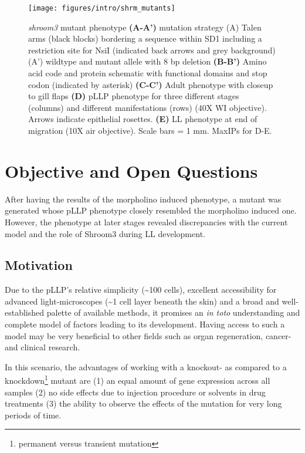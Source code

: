 \documentclass[11pt,singlespacinge,twoside]{reedthesis} %
\begin{document}
\begin{figure}

{\centering \texttt{[image: figures/intro/shrm\_mutants]} 

}

\caption[shroom3 mutant phenotype]{\emph{shroom3} mutant phenotype \textbf{(A-A')} mutation strategy (A) Talen arms (black blocks) bordering a sequence within SD1 including a restriction site for NsiI (indicated back arrows and grey background) (A') wildtype and mutant allele with 8 bp deletion \textbf{(B-B')} Amino acid code and protein schematic with functional domains and stop codon (indicated by asterisk) \textbf{(C-C')} Adult phenotype with closeup to gill flaps \textbf{(D)} pLLP phenotype for three different stages (columns) and different manifestations (rows) (40X WI objective). Arrows indicate epithelial rosettes. \textbf{(E)} LL phenotype at end of migration (10X air objective). Scale bars = 1 mm. MaxIPs for D-E.}\label{fig:shrmmut}
\end{figure}
\hypertarget{objective-and-open-questions}{%
\section{Objective and Open Questions}\label{objective-and-open-questions}}

After having the results of the morpholino induced phenotype, a mutant was generated whose pLLP phenotype closely resembled the morpholino induced one. However, the phenotype at later stages revealed discrepancies with the current model and the role of Shroom3 during LL development.

\hypertarget{motivation}{%
\subsection{Motivation}\label{motivation}}

Due to the pLLP's relative simplicity (\textasciitilde{}100 cells), excellent accessibility for advanced light-microscopes (\textasciitilde{}1 cell layer beneath the skin) and a broad and well-established palette of available methods, it promises an \emph{in toto} understanding and complete model of factors leading to its development. Having access to such a model may be very beneficial to other fields such as organ regeneration, cancer- and clinical research.

In this scenario, the advantages of working with a knockout- as compared to a knockdown\footnote{permanent versus transient mutation} mutant are (1) an equal amount of gene expression across all samples (2) no side effects due to injection procedure or solvents in drug treatments (3) the ability to observe the effects of the mutation for very long periods of time.
\end{document}
